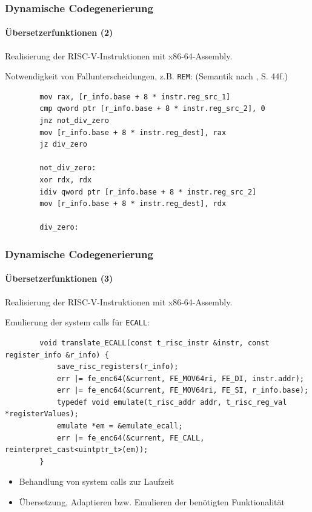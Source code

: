 \documentclass[german]{tum-presentation}
\begin{document}
\begin{frame}[fragile]
	\frametitle{Dynamische Codegenerierung}
	\framesubtitle{Übersetzerfunktionen (2)}
	
	Realisierung der RISC-V-Instruktionen mit x86-64-Assembly.
	
	\vspace{0.3cm}
	Notwendigkeit von Fallunterscheidungen, z.B. \verb!REM!: (Semantik nach , S. 44f.)
	\pause
	\begin{verbatim}
		mov rax, [r_info.base + 8 * instr.reg_src_1]
		cmp qword ptr [r_info.base + 8 * instr.reg_src_2], 0
		jnz not_div_zero
		mov [r_info.base + 8 * instr.reg_dest], rax
		jz div_zero
		
		not_div_zero:
		xor rdx, rdx
		idiv qword ptr [r_info.base + 8 * instr.reg_src_2]
		mov [r_info.base + 8 * instr.reg_dest], rdx
		
		div_zero:
	\end{verbatim}
\end{frame}

\begin{frame}[fragile]
	\frametitle{Dynamische Codegenerierung}
	\framesubtitle{Übersetzerfunktionen (3)}
	
	Realisierung der RISC-V-Instruktionen mit x86-64-Assembly.
	
	\vspace{0.3cm}
	Emulierung der system calls für \verb!ECALL!:
	\pause
	\begin{lstlisting}
		void translate_ECALL(const t_risc_instr &instr, const register_info &r_info) {
			save_risc_registers(r_info);
			err |= fe_enc64(&current, FE_MOV64ri, FE_DI, instr.addr);
			err |= fe_enc64(&current, FE_MOV64ri, FE_SI, r_info.base);
			typedef void emulate(t_risc_addr addr, t_risc_reg_val *registerValues);
			emulate *em = &emulate_ecall;
			err |= fe_enc64(&current, FE_CALL, reinterpret_cast<uintptr_t>(em));
		}
	\end{lstlisting}
	
	\pause
	\begin{itemize}
		\item Behandlung von system calls zur Laufzeit
		\item Übersetzung, Adaptieren bzw. Emulieren der benötigten Funktionalität
	\end{itemize}
\end{frame}
\end{document}

